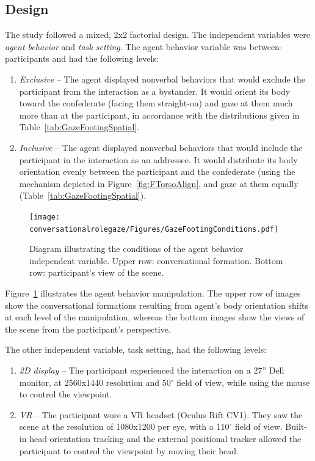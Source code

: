 \subsection{Design}

The study followed a mixed, 2x2 factorial design. The independent variables were \emph{agent behavior} and \emph{task setting}. The agent behavior variable was between-participants and had the following levels:

\begin{enumerate}
\item \emph{Exclusive} -- The agent displayed nonverbal behaviors that would exclude the participant from the interaction as a bystander. It would orient its body toward the confederate (facing them straight-on) and gaze at them much more than at the participant, in accordance with the distributions given in Table~\ref{tab:GazeFootingSpatial}.
\item \emph{Inclusive} -- The agent displayed nonverbal behaviors that would include the participant in the interaction as an addressee. It would distribute its body orientation evenly between the participant and the confederate (using the mechanism depicted in Figure~\ref{fig:FTorsoAlign}, and gaze at them equally (Table~\ref{tab:GazeFootingSpatial}).
\end{enumerate}

\begin{figure}
\centering
\texttt{[image: conversationalrolegaze/Figures/GazeFootingConditions.pdf]}
\caption{Diagram illustrating the conditions of the agent behavior independent variable. Upper row: conversational formation. Bottom row: participant's view of the scene.}
\label{fig:GazeFootingConditions}
\end{figure}

Figure~\ref{fig:GazeFootingConditions} illustrates the agent behavior manipulation. The upper row of images show the conversational formations resulting from agent's body orientation shifts at each level of the manipulation, whereas the bottom images show the views of the scene from the participant's perspective.

The other independent variable, task setting, had the following levels:

\begin{enumerate}
\item \emph{2D display} -- The participant experienced the interaction on a 27'' Dell monitor, at 2560x1440 resolution and 50$^\circ$ field of view, while using the mouse to control the viewpoint.
\item \emph{VR} -- The participant wore a VR headset (Oculus Rift CV1). They saw the scene at the resolution of 1080x1200 per eye, with a 110$^\circ$ field of view. Built-in head orientation tracking and the external positional tracker allowed the participant to control the viewpoint by moving their head.
\end{enumerate}

